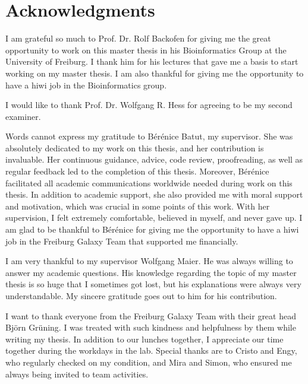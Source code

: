 %
\section*{Acknowledgments}

I am grateful so much to Prof. Dr. Rolf Backofen for giving me the great opportunity to work on this master thesis in his Bioinformatics Group at the University of Freiburg. I thank him for his lectures that gave me a basis to start working on my master thesis. I am also thankful for giving me the opportunity to have a hiwi job in the Bioinformatics group.

I would like to thank Prof. Dr. Wolfgang R. Hess for agreeing to be my second examiner.

Words cannot express my gratitude to Bérénice Batut, my supervisor. She was absolutely dedicated to my work on this thesis, and her contribution is invaluable. Her continuous guidance, advice, code review, proofreading, as well as regular feedback led to the completion of this thesis. Moreover, Bérénice facilitated all academic communications worldwide needed during work on this thesis. In addition to academic support, she also provided me with moral support and motivation, which was crucial in some points of this work. With her supervision, I felt extremely comfortable, believed in myself, and never gave up. I am glad to be thankful to Bérénice for giving me the opportunity to have a hiwi job in the Freiburg Galaxy Team that supported me financially.

I am very thankful to my supervisor Wolfgang Maier. He was always willing to answer my academic questions. His knowledge regarding the topic of my master thesis is so huge that I sometimes got lost, but his explanations were always very understandable. My sincere gratitude goes out to him for his contribution.

I want to thank everyone from the Freiburg Galaxy Team with their great head Björn Grüning. I was treated with such kindness and helpfulness by them while writing my thesis. In addition to our lunches together, I appreciate our time together during the workdays in the lab. Special thanks are to Cristo and Engy, who regularly checked on my condition, and Mira and Simon, who ensured me always being invited to team activities. 

